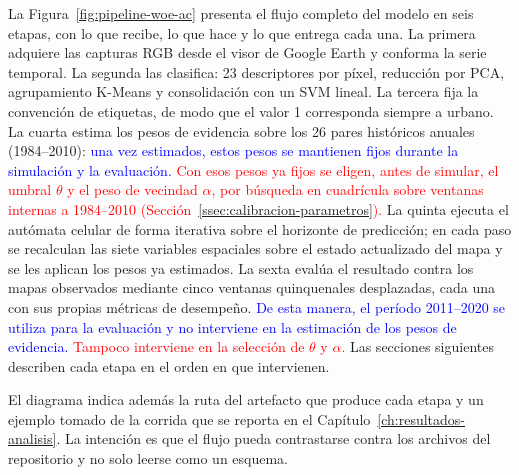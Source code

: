 La Figura~\ref{fig:pipeline-woe-ac} presenta el flujo completo del modelo en seis etapas, con lo que recibe, lo que hace y lo que entrega cada una. La primera adquiere las capturas RGB desde el visor de Google Earth y conforma la serie temporal. La segunda las clasifica: 23 descriptores por píxel, reducción por PCA, agrupamiento K-Means y consolidación con un SVM lineal. La tercera fija la convención de etiquetas, de modo que el valor 1 corresponda siempre a urbano. La cuarta estima los pesos de evidencia sobre los 26 pares históricos anuales (1984--2010):
\textcolor{blue}{una vez estimados, estos pesos se mantienen fijos durante la
simulación y la evaluación.} \textcolor{red}{Con esos pesos ya fijos se eligen, antes de simular, el umbral $\theta$ y el peso de vecindad $\alpha$, por búsqueda en cuadrícula sobre ventanas internas a 1984--2010 (Sección~\ref{ssec:calibracion-parametros}).} La quinta ejecuta el autómata celular de forma iterativa sobre el horizonte de predicción; en cada paso se recalculan las siete variables espaciales sobre el estado actualizado del mapa y se les aplican los pesos ya estimados. La sexta evalúa el resultado contra los mapas observados mediante cinco ventanas quinquenales desplazadas, cada una con sus propias métricas de desempeño.
\textcolor{blue}{De esta manera, el período 2011--2020 se utiliza para la evaluación
y no interviene en la estimación de los pesos de evidencia.} \textcolor{red}{Tampoco interviene en la selección de $\theta$ y $\alpha$.} Las secciones siguientes
describen cada etapa en el orden en que intervienen.

El diagrama indica además la ruta del artefacto que produce cada etapa y un ejemplo tomado de la corrida que se reporta en el Capítulo~\ref{ch:resultados-analisis}. La intención es que el flujo pueda contrastarse contra los archivos del repositorio y no solo leerse como un esquema.

